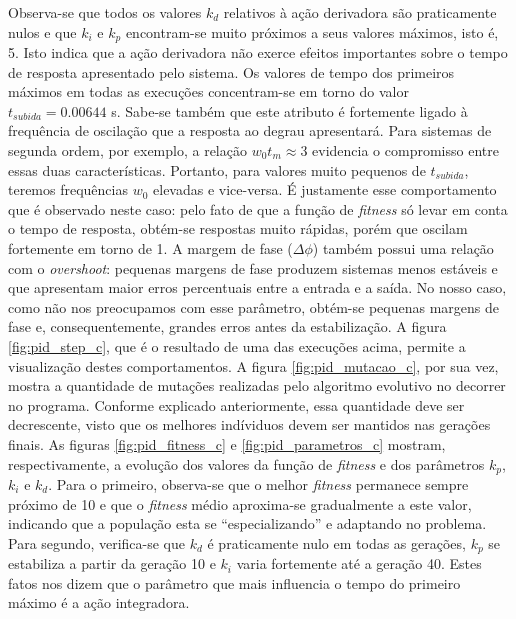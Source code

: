 \begin {enumerate}
    Observa-se que todos os valores \(k_d\) relativos à ação derivadora são
    praticamente nulos e que \(k_i\) e \(k_p\) encontram-se muito próximos a
    seus valores máximos, isto é, 5. Isto indica que a ação derivadora não
    exerce efeitos importantes sobre o tempo de resposta apresentado pelo
    sistema.    Os valores de tempo dos primeiros máximos em todas as execuções
    concentram-se em torno do valor \(t_{subida} = 0.00644\) s. Sabe-se também
    que este atributo é fortemente ligado à frequência de oscilação que a
    resposta ao degrau apresentará. Para sistemas de segunda ordem, por exemplo,
    a relação \(w_0t_m \approx 3\) evidencia o compromisso entre essas duas
    características.  Portanto, para valores muito pequenos de \(t_{subida}\),
    teremos frequências \(w_0\) elevadas e vice-versa. É justamente esse
    comportamento que é observado neste caso: pelo fato de que a função de
    \textit{fitness} só levar em conta o tempo de resposta, obtém-se respostas
    muito rápidas, porém que oscilam fortemente em torno de 1. A margem de fase
    (\(\Delta \phi\)) também possui uma relação com o \textit{overshoot}:
    pequenas margens de fase produzem sistemas menos estáveis e que apresentam
    maior erros percentuais entre a entrada e a saída. No nosso caso, como não
    nos preocupamos com esse parâmetro, obtém-se pequenas margens de fase e,
    consequentemente, grandes erros antes da estabilização. A figura
    \ref{fig:pid_step_c}, que é o resultado de uma das execuções acima, permite
    a visualização destes comportamentos. A figura \ref{fig:pid_mutacao_c}, por
    sua vez, mostra a quantidade de mutações realizadas pelo algoritmo evolutivo
    no decorrer no programa. Conforme explicado anteriormente, essa quantidade
    deve ser decrescente, visto que os melhores indíviduos devem ser mantidos
    nas gerações finais. As figuras \ref{fig:pid_fitness_c} e
    \ref{fig:pid_parametros_c} mostram, respectivamente, a evolução dos valores
    da função de \textit{fitness} e dos parâmetros \(k_p\), \(k_i\) e \(k_d\).
    Para o primeiro, observa-se que o melhor \textit{fitness} permanece sempre
    próximo de 10 e que o \textit{fitness} médio aproxima-se gradualmente a este
    valor, indicando que a população esta se ``especializando'' e adaptando no
    problema. Para segundo, verifica-se que \(k_d\) é praticamente nulo em todas
    as gerações, \(k_p\) se estabiliza a partir da geração 10 e \(k_i\) varia
    fortemente até a geração 40. Estes fatos nos dizem que o parâmetro que mais
    influencia o tempo do primeiro máximo é a ação integradora.


\end{enumerate}
